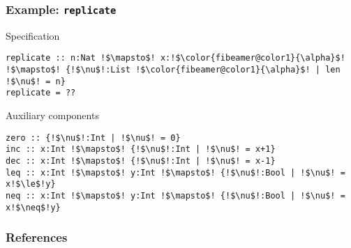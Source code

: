 \documentclass{beamer}
\theoremstyle{definition} %
\begin{document}
\begin{frame}[fragile]
	\frametitle{Example: \texttt{replicate}}

	\begin{exampleblock}{Specification}
		\vspace*{-.2\baselineskip}
		\begin{lstlisting}[escapechar=!,style=synquid]
replicate :: n:Nat !$\mapsto$! x:!$\color{fibeamer@color1}{\alpha}$! !$\mapsto$! {!$\nu$!:List !$\color{fibeamer@color1}{\alpha}$! | len !$\nu$! = n}
replicate = ??
		\end{lstlisting}
	\end{exampleblock}

	\begin{exampleblock}{Auxiliary components}
		\vspace*{-.2\baselineskip}
		\begin{lstlisting}[escapechar=!,style=synquid]
zero :: {!$\nu$!:Int | !$\nu$! = 0}
inc :: x:Int !$\mapsto$! {!$\nu$!:Int | !$\nu$! = x+1}
dec :: x:Int !$\mapsto$! {!$\nu$!:Int | !$\nu$! = x-1}
leq :: x:Int !$\mapsto$! y:Int !$\mapsto$! {!$\nu$!:Bool | !$\nu$! = x!$\le$!y}
neq :: x:Int !$\mapsto$! y:Int !$\mapsto$! {!$\nu$!:Bool | !$\nu$! = x!$\neq$!y}
		\end{lstlisting}
	\end{exampleblock}

\end{frame}

\begin{frame}[allowframebreaks]
  \frametitle{References}
  \printbibliography
 \end{frame}
\end{document}
